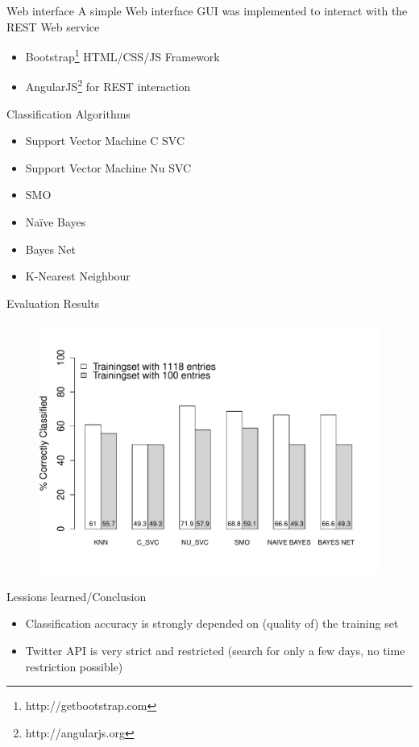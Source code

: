 \documentclass{beamer}
\begin{document}
\begin{frame}{Web interface}
A simple Web interface GUI was implemented to interact with the REST Web service
\begin{itemize}
 \item Bootstrap\footnote{http://getbootstrap.com} HTML/CSS/JS Framework
 \item AngularJS\footnote{http://angularjs.org} for REST interaction
\end{itemize}
\end{frame}

\begin{frame}{Classification Algorithms}
  \begin{itemize}
	\item Support Vector Machine C SVC
	\item Support Vector Machine Nu SVC
	\item SMO
	\item Na\"ive Bayes
	\item Bayes Net
	\item K-Nearest Neighbour
 \end{itemize}
\end{frame}

\begin{frame}{Evaluation Results}
\begin{figure}
	\includegraphics[width=1\textwidth]{evaluation}
\end{figure}
\end{frame}

\begin{frame}{Lessions learned/Conclusion}
\begin{itemize}
 \item Classification accuracy is strongly depended on (quality of) the training set
 \item Twitter API is very strict and restricted (search for only a few days, no time restriction possible)
 \end{itemize}
\end{frame}
\end{document}
